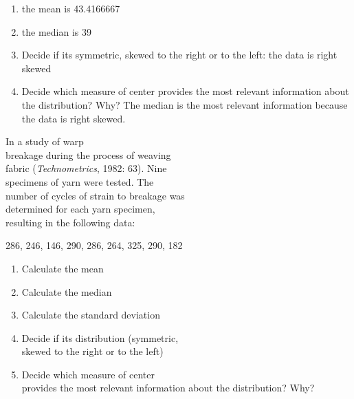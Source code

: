 \documentclass[11pt]{book}\usepackage[]{graphicx}\usepackage[]{color}
\begin{document}
\begin{exercises}
\begin{exercise}
\end{exercise}
\begin{solution}  %

\begin{enumerate}
\item the mean is 43.4166667
\item the median is 39
\item Decide if its symmetric, skewed to the right or to the left: the data is right skewed
\item Decide which measure of center provides the most relevant information about the distribution? Why?  The median is the most relevant information because the data is right skewed.
\end{enumerate}

\end{solution}



\begin{exercise} %



In a study of warp \\ breakage during the process of weaving \\ fabric (\textit{Technometrics}, 1982: 63).  Nine \\ specimens of yarn were tested.  The \\ number of cycles of strain to breakage was \\ determined for each yarn specimen, \\ resulting in the following  data:

\vspace{3mm}

{\small{
286, 246, 146, 290, 286, 264, 325, 290, 182 
}}


\begin{enumerate}
\item Calculate the mean
\item Calculate the median
\item Calculate the standard deviation
\item Decide if its distribution (symmetric, \\ skewed to the right or to the left)
\item Decide which measure of center \\ provides the most relevant information about the distribution? Why?
\end{enumerate}

\end{exercise}
% 
% 


\end{exercises}
\end{document}
